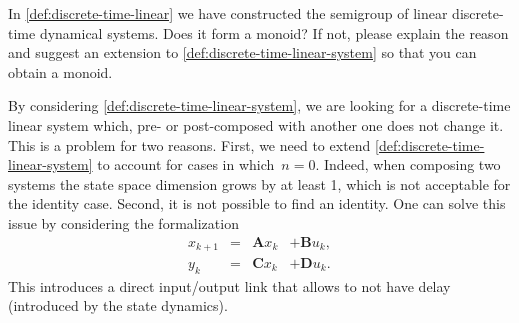 \begin{exercise}
    In \cref{def:discrete-time-linear} we have constructed the semigroup of linear discrete-time dynamical systems.
    Does it form a monoid?
    If not, please explain the reason and suggest an extension to \cref{def:discrete-time-linear-system} so that you can obtain a monoid.
\end{exercise}
\begin{solution}
    By considering \cref{def:discrete-time-linear-system}, we are looking for a discrete-time linear system which, pre- or post-composed with another one does not change it.
    This is a problem for two reasons.
    First, we need to extend \cref{def:discrete-time-linear-system} to account for cases in which~$n=0$.
    Indeed, when composing two systems the state space dimension grows by at least 1, which is not acceptable for the identity case.
    Second, it is not possible to find an identity.
    One can solve this issue by considering the formalization
    \begin{equation}
        \label{eq:discrete-time-dynamics-D}
        \begin{aligned}
            x_{k+1} & = & \mathbf{A} x_k & + \mathbf{B} u_k, \\
            y_{k}   & = & \mathbf{C} x_k & + \mathbf{D} u_k.
        \end{aligned}
    \end{equation}
    This introduces a direct input/output link that allows to not have delay (introduced by the state dynamics).
\end{solution}
